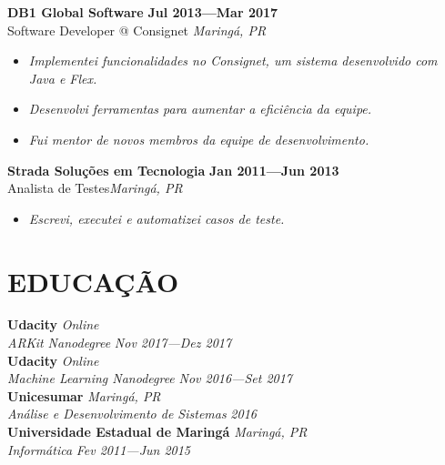 \documentclass[line,margin]{res}
\begin{document}
\begin{resume}
  {\bf DB1 Global Software} \hfill {\bf Jul 2013---Mar 2017} \\
  Software Developer @ Consignet \hfill {\sl Maring\'a, PR}\\[-6pt]
  \begin{itemize}
    \item {\sl Implementei funcionalidades no Consignet, um sistema desenvolvido com Java e Flex.}
    \item {\sl Desenvolvi ferramentas para aumentar a eficiência da equipe.}
    \item {\sl Fui mentor de novos membros da equipe de desenvolvimento.}
  \end{itemize}

  {\bf Strada Solu\c{c}\~oes em Tecnologia} \hfill {\bf Jan 2011---Jun 2013} \\
  Analista de Testes\hfill {\sl Maring\'a, PR}\\[-6pt]
    \begin{itemize}
    \item {\sl Escrevi, executei e automatizei casos de teste.}
  \end{itemize}


\section{EDUCAÇÃO}
  {\bf Udacity} \hfill {\sl Online} \\
  {\sl ARKit Nanodegree} \hfill {\sl Nov 2017---Dez 2017}\\[6pt]
  {\bf Udacity} \hfill {\sl Online} \\
  {\sl Machine Learning Nanodegree} \hfill {\sl Nov 2016---Set 2017}\\[6pt]
  {\bf Unicesumar} \hfill {\sl Maring\'a, PR} \\
  {\sl Análise e Desenvolvimento de Sistemas} \hfill {\sl 2016}\\[6pt]
  {\bf Universidade Estadual de Maringá} \hfill {\sl Maring\'a, PR} \\
  {\sl Informática} \hfill {\sl Fev 2011---Jun 2015}



\end{resume}
\end{document}
